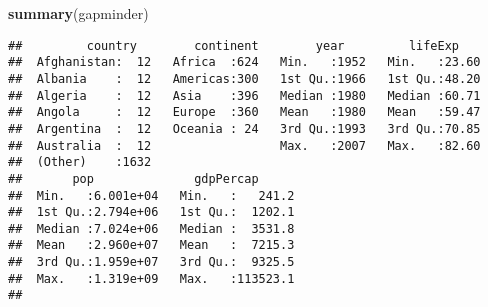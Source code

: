 \documentclass[
]{article}
\newenvironment{Shaded}{\begin{snugshade}}{\end{snugshade}}
\newcommand{\FunctionTok}[1]{\textcolor[rgb]{0.13,0.29,0.53}{\textbf{#1}}}
\newcommand{\NormalTok}[1]{#1}
\newcommand{\SpecialCharTok}[1]{\textcolor[rgb]{0.81,0.36,0.00}{\textbf{#1}}}
\begin{document}
\begin{Shaded}
\begin{Highlighting}[]
\FunctionTok{summary}\NormalTok{(gapminder)}
\end{Highlighting}
\end{Shaded}

\begin{verbatim}
##         country        continent        year         lifeExp     
##  Afghanistan:  12   Africa  :624   Min.   :1952   Min.   :23.60  
##  Albania    :  12   Americas:300   1st Qu.:1966   1st Qu.:48.20  
##  Algeria    :  12   Asia    :396   Median :1980   Median :60.71  
##  Angola     :  12   Europe  :360   Mean   :1980   Mean   :59.47  
##  Argentina  :  12   Oceania : 24   3rd Qu.:1993   3rd Qu.:70.85  
##  Australia  :  12                  Max.   :2007   Max.   :82.60  
##  (Other)    :1632                                                
##       pop              gdpPercap       
##  Min.   :6.001e+04   Min.   :   241.2  
##  1st Qu.:2.794e+06   1st Qu.:  1202.1  
##  Median :7.024e+06   Median :  3531.8  
##  Mean   :2.960e+07   Mean   :  7215.3  
##  3rd Qu.:1.959e+07   3rd Qu.:  9325.5  
##  Max.   :1.319e+09   Max.   :113523.1  
## 
\end{verbatim}

\begin{Shaded}
\end{Shaded}
\end{document}
